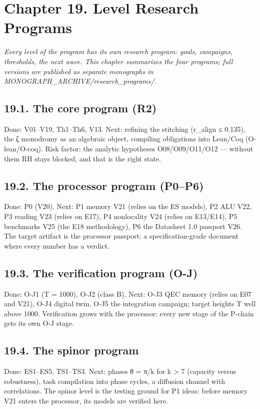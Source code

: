 \documentclass[11pt,a4paper]{article}
\begin{document}
\section{Chapter 19. Level Research Programs}

\noindent\textit{\color{copper}Every level of the program has its own research program: goals, campaigns, thresholds, the next wave. This chapter summarizes the four programs; full versions are published as separate monographs in MONOGRAPH\_ARCHIVE/research\_programs/.}

\subsection{19.1. The core program (R2)}

Done: V01–V19, Th1–Th6, V13. Next: refining the stitching (r\_align ≤ 0.135), the ζ monodromy as an algebraic object, compiling obligations into Lean/Coq (O-lean/O-coq). Risk factor: the analytic hypotheses O08/O09/O11/O12 — without them RH stays blocked, and that is the right state.

\subsection{19.2. The processor program (P0–P6)}

Done: P0 (V20). Next: P1 memory V21 (relies on the ES models), P2 ALU V22, P3 reading V23 (relies on E17), P4 nonlocality V24 (relies on E13/E14), P5 benchmarks V25 (the E18 methodology), P6 the Datasheet 1.0 passport V26. The target artifact is the processor passport: a specification-grade document where every number has a verdict.

\subsection{19.3. The verification program (O-J)}

Done: O-J1 (T = 1000), O-J2 (class B). Next: O-J3 QEC memory (relies on E07 and V21), O-J4 digital twin, O-J5 the integration campaign; target heights T well above 1000. Verification grows with the processor: every new stage of the P-chain gets its own O-J stage.

\subsection{19.4. The spinor program}

Done: ES1–ES5, TS1–TS3. Next: phases θ = π/k for k > 7 (capacity versus robustness), task compilation into phase cycles, a diffusion channel with correlations. The spinor level is the testing ground for P1 ideas: before memory V21 enters the processor, its models are verified here.
\end{document}
